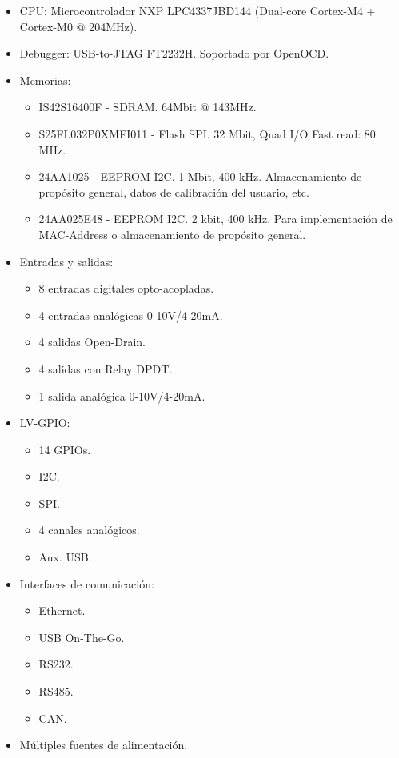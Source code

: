 \begin{itemize}
\item CPU: Microcontrolador NXP LPC4337JBD144 (Dual-core Cortex-M4 + Cortex-M0 @ 204MHz).
\item Debugger: USB-to-JTAG FT2232H. Soportado por OpenOCD.
\item Memorias: 
   \begin{itemize}
   \item IS42S16400F - SDRAM. 64Mbit @ 143MHz.
   \item S25FL032P0XMFI011 - Flash SPI. 32 Mbit, Quad I/O Fast read: 80 MHz.
   \item 24AA1025 - EEPROM I2C. 1 Mbit, 400 kHz. Almacenamiento de propósito general, datos de calibración del usuario, etc.
   \item 24AA025E48 - EEPROM I2C. 2 kbit, 400 kHz. Para implementación de MAC-Address o almacenamiento de propósito general.
   \end{itemize}
\item Entradas y salidas:   
   \begin{itemize}
   \item 8 entradas digitales opto-acopladas.
   \item 4 entradas analógicas 0-10V/4-20mA.
   \item 4 salidas Open-Drain. 
   \item 4 salidas con Relay DPDT.
   \item 1 salida analógica 0-10V/4-20mA.
   \end{itemize}
\item LV-GPIO:
   \begin{itemize}
   \item 14 GPIOs.
   \item I2C.
   \item SPI.
   \item 4 canales analógicos.
   \item Aux. USB.
   \end{itemize}
\item
Interfaces de comunicación:
   \begin{itemize}
   \item Ethernet.
   \item USB On-The-Go.
   \item RS232.
   \item RS485.
   \item CAN.
   \end{itemize}
\item Múltiples fuentes de alimentación.

\end{itemize}

